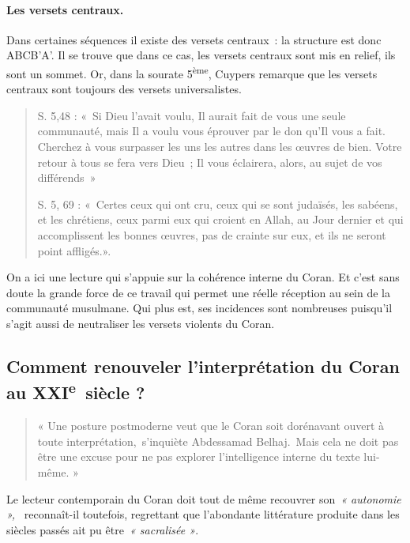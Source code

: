 \paragraph{\textbf{Les versets centraux.}}

Dans certaines séquences il existe des versets centraux~: la structure
est donc ABCB'A'. Il se trouve que dans ce cas, les versets centraux
sont mis en relief, ils sont un sommet. Or, dans la sourate
5\textsuperscript{ème}, Cuypers remarque que les versets centraux sont
toujours des versets universalistes.
\begin{quote}
    S. 5,48 : «~Si Dieu l'avait voulu, Il aurait fait de vous une seule
communauté, mais Il a voulu vous éprouver par le don qu'Il vous a fait.
Cherchez à vous surpasser les uns les autres dans les œuvres de bien.
Votre retour à tous se fera vers Dieu~; Il vous éclairera, alors, au
sujet de vos différends~»


S. 5, 69 : «~Certes ceux qui ont cru, ceux qui se sont judaïsés, les
sabéens, et les chrétiens, ceux parmi eux qui croient en Allah, au Jour
dernier et qui accomplissent les bonnes œuvres, pas de crainte sur eux,
et ils ne seront point affligés.».


\end{quote}

On a ici une lecture qui s'appuie sur la cohérence interne du Coran. Et
c'est sans doute la grande force de ce travail qui permet une réelle
réception au sein de la communauté musulmane. Qui plus est, ses
incidences sont nombreuses puisqu'il s'agit aussi de neutraliser les
versets violents du Coran.


\subsection{Comment renouveler l'interprétation du Coran au
XXI\textsuperscript{e}~siècle ?}

\begin{quote}
{« Une posture postmoderne veut que le Coran soit dorénavant ouvert
à toute interprétation,~}s'inquiète Abdessamad Belhaj.{~Mais cela
ne doit pas être une excuse pour ne pas explorer l'intelligence interne
du texte lui-même. »}  
\end{quote}
Le lecteur contemporain du Coran doit tout de même
recouvrer son~\emph{« autonomie »,}  ~reconnaît-il toutefois, regrettant
que l'abondante littérature produite dans les siècles passés ait pu
être~\emph{« sacralisée »}.



